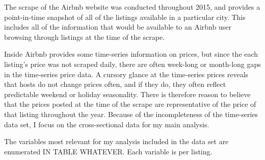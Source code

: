 \documentclass[11pt, oneside]{article}
\begin{document}
The scrape of the Airbnb website was conducted throughout 2015, and provides a point-in-time snapshot of all of the listings available in a particular city. This includes all of the information that would be available to an Airbnb user browsing through listings at the time of the scrape. 

Inside Airbnb provides some time-series information on prices, but since the each listing's price was not scraped daily, there are often week-long or month-long gaps in the time-series price data. A cursory glance at the time-series prices reveals that hosts do not change prices often, and if they do, they often reflect predictable weekend or holiday seasonality. There is therefore reason to believe that the prices posted at the time of the scrape are representative of the price of that listing throughout the year. Because of the incompleteness of the time-series data set, I focus on the cross-sectional data for my main analysis.  

The variables most relevant for my analysis included in the data set are enumerated IN TABLE WHATEVER. Each variable is per listing. 
\end{document}
